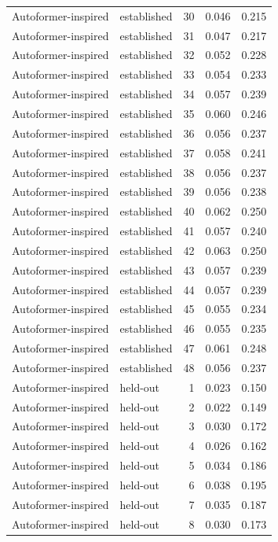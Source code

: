 \begin{tabular}{llrrr}
Autoformer-inspired & established & 30 & 0.046 & 0.215 \\
Autoformer-inspired & established & 31 & 0.047 & 0.217 \\
Autoformer-inspired & established & 32 & 0.052 & 0.228 \\
Autoformer-inspired & established & 33 & 0.054 & 0.233 \\
Autoformer-inspired & established & 34 & 0.057 & 0.239 \\
Autoformer-inspired & established & 35 & 0.060 & 0.246 \\
Autoformer-inspired & established & 36 & 0.056 & 0.237 \\
Autoformer-inspired & established & 37 & 0.058 & 0.241 \\
Autoformer-inspired & established & 38 & 0.056 & 0.237 \\
Autoformer-inspired & established & 39 & 0.056 & 0.238 \\
Autoformer-inspired & established & 40 & 0.062 & 0.250 \\
Autoformer-inspired & established & 41 & 0.057 & 0.240 \\
Autoformer-inspired & established & 42 & 0.063 & 0.250 \\
Autoformer-inspired & established & 43 & 0.057 & 0.239 \\
Autoformer-inspired & established & 44 & 0.057 & 0.239 \\
Autoformer-inspired & established & 45 & 0.055 & 0.234 \\
Autoformer-inspired & established & 46 & 0.055 & 0.235 \\
Autoformer-inspired & established & 47 & 0.061 & 0.248 \\
Autoformer-inspired & established & 48 & 0.056 & 0.237 \\
Autoformer-inspired & held-out & 1 & 0.023 & 0.150 \\
Autoformer-inspired & held-out & 2 & 0.022 & 0.149 \\
Autoformer-inspired & held-out & 3 & 0.030 & 0.172 \\
Autoformer-inspired & held-out & 4 & 0.026 & 0.162 \\
Autoformer-inspired & held-out & 5 & 0.034 & 0.186 \\
Autoformer-inspired & held-out & 6 & 0.038 & 0.195 \\
Autoformer-inspired & held-out & 7 & 0.035 & 0.187 \\
Autoformer-inspired & held-out & 8 & 0.030 & 0.173 \\

\end{tabular}
